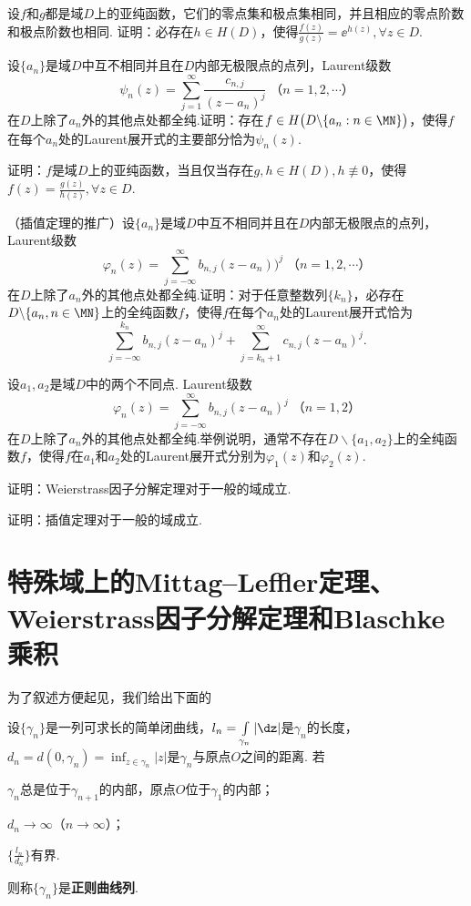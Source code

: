 \begin{xiti}
\item 设$f$和$g$都是域$D$上的亚纯函数，它们的零点集和极点集相同，并且相应的零点阶数和极点阶数也相同. 证明：必存在$h\in H(D)$，使得$\frac{f(z)}{g(z)}=\ee^{h(z)},\forall z\in D$.
\item 设$\{a_n\}$是域$D$中互不相同并且在$D$内部无极限点的点列，Laurent级数
\[\psi_n(z)=\sum_{j=1}^\infty\frac{c_{n,j}}{(z-a_n)^j}\;\mbox{（$n=1,2,\cdots$）}\]
在$D$上除了$a_n$外的其他点处都全纯.证明：存在$f\in H\big(D\backslash
\{a_n:n\in\MN\}\big)$，使得$f$在每个$a_n$处的Laurent展开式的主要部分恰为$\psi_n(z)$.
\item 证明：$f$是域$D$上的亚纯函数，当且仅当存在$g,h\in H(D),h\not\equiv0$，使得$f(z)=\frac{g(z)}{h(z)},\forall z\in D$.
\item （插值定理的推广）设$\{a_n\}$是域$D$中互不相同并且在$D$内部无极限点的点列，Laurent级数
\[\varphi_n(z)=\sum_{j=-\infty}^\infty b_{n,j}(z-a_n))^j\;\mbox{（$n=1,2,\cdots$）}\]
在$D$上除了$a_n$外的其他点处都全纯.证明：对于任意整数列$\{k_n\}$，必存在$D\backslash
\{a_n,n\in\MN\}$上的全纯函数$f$，使得$f$在每个$a_n$处的Laurent展开式恰为
\[\sum_{j=-\infty}^{k_n}b_{n,j}(z-a_n)^j+\sum_{j=k_n+1}^\infty c_{n,j}(z-a_n)^j.\]
\item 设$a_1,a_2$是域$D$中的两个不同点. Laurent级数
\[\varphi_n(z)=\sum_{j=-\infty}^\infty b_{n,j}(z-a_n)^j\;\mbox{（$n=1,2$）}\]
在$D$上除了$a_n$外的其他点处都全纯.举例说明，通常不存在$D\backslash\{a_1,a_2\}$上的全纯函数$f$，使得$f$在$a_1$和$a_2$处的Laurent展开式分别为$\varphi_1(z)$和$\varphi_2(z)$.
\item 证明：Weierstrass因子分解定理对于一般的域成立.
\item 证明：插值定理对于一般的域成立.
\end{xiti}

\section{特殊域上的Mittag--Leffler定理、
Weierstrass因子分解定理和Blaschke 乘积\label{sec5.7}}
为了叙述方便起见，我们给出下面的
\begin{definition}\label{def5.7.1}
设$\{\gamma_n\}$是一列可求长的简单闭曲线，$l_n=\int\limits_{\gamma_n}|\dz|$是$\gamma_n$的长度，$d_n=d(0,\gamma_n)=\inf_{z\in\gamma_n}|z|$是$\gamma_n$与原点$O$之间的距离. 若
\begin{eenum}
  \item $\gamma_n$总是位于$\gamma_{n+1}$的内部，原点$O$位于$\gamma_1$的内部；
  \item $d_n\to\infty$（$n\to\infty$）；
  \item $\bigg\{\frac{l_n}{d_n}\bigg\}$有界.
\end{eenum}
则称$\{\gamma_n\}$是\textbf{正则曲线列}.
\end{definition}

